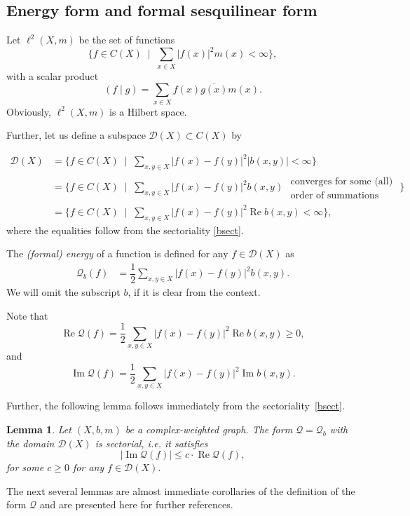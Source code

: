 \documentclass[10pt,a4paper]{amsart}
\newtheorem{lemma}[theorem]{Lemma}
\renewcommand{\Re}{\operatorname{Re}}%
\renewcommand{\Im}{\operatorname{Im}}%
\newcommand{\abs}[1]{\left|#1\right|}%
\newcommand{\D}{\mathcal{D}}
\newcommand{\Q}{\mathcal{Q}}
\begin{document}
\subsection{Energy form and formal sesquilinear form }


 Let $\ell^2(X,m)$ be the set of functions
$$\{f\in C(X)\;\mid\;\sum_{x\in X}|f(x)|^2m(x)<\infty\big\},
$$
with a scalar product
$$
(f\mid g)=\sum_{x\in X} f(x)\overline{g(x)}m(x).
$$
Obviously, $\ell^2(X,m)$  is a Hilbert space.

Further, let us define a subspace $\mathcal D(X)\subset C(X)$ by

\begin{align*}
\mathcal D(X)&=\Big\{f\in C(X)\;\mid\;\sum_{x,y\in X}\abs{f(x)-f(y)}^2 |b(x,y)|<\infty\Big\}\\
&=\Big\{f\in C(X)\;\mid\; \sum_{x,y\in X}\abs{f(x)-f(y)}^2 b(x,y)\substack{ \mbox{ converges for some (all) }\\\mbox{ order of summations}}\Big\}\\
&=\Big\{f\in C(X)\;\mid\;\sum_{x,y \in X}\abs{f(x)-f(y)}^2 \Re b(x,y) <\infty\Big\},
\end{align*}
where the equalities follow from the sectoriality \eqref{bsect}.





The {\em (formal) energy} of a function is defined for any $f\in \mathcal D(X)$ as 
\begin{align*}
\mathcal Q_b(f)&=\dfrac12 \sum_{x,y\in X}\abs{f(x)-f(y)}^2b(x,y).
\end{align*}
We will omit the subscript $b$, if it is clear from the context.



Note that 
\begin{equation*}%
\Re \mathcal Q(f)=\dfrac12 \sum_{x,y\in X}\abs{f(x)-f(y)}^2\Re b(x,y)\ge 0,
\end{equation*}
and
$$
\Im \mathcal Q(f)=\dfrac12 \sum_{x,y\in X}\abs{f(x)-f(y)}^2\Im b(x,y).
$$

Further,  the following lemma follows immediately from the sectoriality~\eqref{bsect}.
\begin{lemma}\label{lem::formalQmapstosector}
Let $(X,b,m)$ be a complex-weighted graph. The  form $\mathcal Q=\mathcal Q_b$ with the domain $\D(X)$ is sectorial, i.e. it satisfies
$$
|\Im \mathcal Q(f)|\le  c \cdot\Re \mathcal Q(f),
$$
for some $c\ge0 $ for any $f\in \D(X)$.
\end{lemma}
The next several lemmas are almost immediate corollaries of the definition of the form $\Q$ and are presented here for further references.
\end{document}
